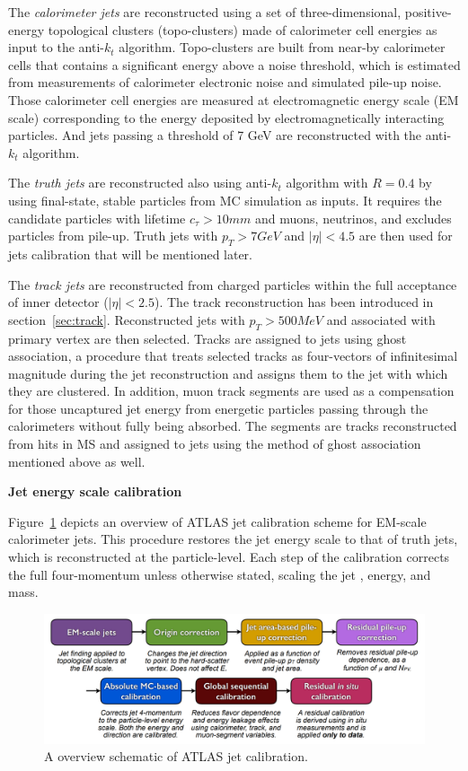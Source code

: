 The \textit{calorimeter jets} are reconstructed using a set of three-dimensional, positive-energy topological clusters (topo-clusters) made of calorimeter cell energies as input to the anti-$k_{t}$ algorithm\cite{Aaboud:2017jcu}.
Topo-clusters are built from near-by calorimeter cells that contains a significant energy above a noise threshold,
which is estimated from measurements of calorimeter electronic noise and simulated pile-up noise.
Those calorimeter cell energies are measured at electromagnetic energy scale (EM scale) corresponding to the energy deposited by electromagnetically interacting particles. 
And jets passing a \pt threshold of 7 GeV are reconstructed with the anti-$k_{t}$ algorithm.

The \textit{truth jets} are reconstructed also using anti-$k_{t}$ algorithm with $R = 0.4$ by using final-state, stable particles from MC simulation as inputs.
It requires the candidate particles with lifetime $c_{\tau} > 10mm$ and muons, neutrinos, and excludes particles from pile-up.
Truth jets with $p_{T} > 7 GeV$ and $|\eta| < 4.5$ are then used for jets calibration that will be mentioned later.

The \textit{track jets} are reconstructed from charged particles within the full acceptance of inner detector ($|\eta| < 2.5$).
The track reconstruction has been introduced in section~\ref{sec:track}.
Reconstructed jets with $p_{T} > 500 MeV$ and associated with primary vertex are then selected.
Tracks are assigned to jets using ghost association\cite{CACCIARI2008119}, a procedure that treats selected tracks as four-vectors of infinitesimal magnitude during the jet reconstruction and assigns them to the jet with which they are clustered.
In addition, muon track segments are used as a compensation for those uncaptured jet energy from energetic particles passing through the calorimeters without fully being absorbed.
The segments are tracks reconstructed from hits in MS and assigned to jets using the method of ghost association mentioned above as well.

\textbf{Jet energy scale calibration}

Figure~\ref{fig:jet_cali} depicts an overview of ATLAS jet calibration scheme for EM-scale calorimeter jets.
This procedure restores the jet energy scale to that of truth jets, which is reconstructed at the particle-level.
Each step of the calibration corrects the full four-momentum unless otherwise stated, scaling the jet \pt, energy, and mass.
\begin{figure}[!htb]
  \centering
  \includegraphics[width=1.0\textwidth]{figures/Simulation/jet_calibration.png}
  \caption{A overview schematic of ATLAS jet calibration\cite{Aaboud:2017jcu}.}
  \label{fig:jet_cali}
\end{figure}

